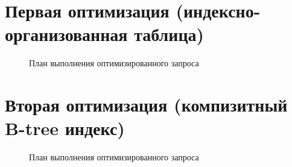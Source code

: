 \section{Первая оптимизация (индексно-организованная таблица)}


\begin{figure}[H]%
  \caption{План выполнения оптимизированного запроса}
  \label{fig-task-4-iot-plan}
\end{figure}


\section{Вторая оптимизация (компизитный B-tree индекс)}


\begin{figure}[H]%
  \caption{План выполнения оптимизированного запроса}
  \label{fig-task-4-composite-plan}
\end{figure}
